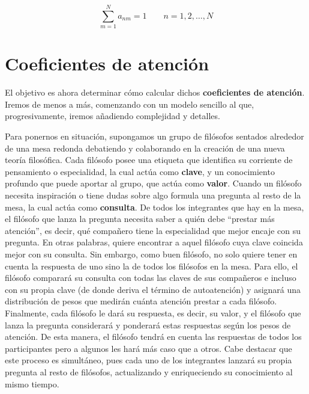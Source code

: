 \begin{equation}
    \sum_{m=1}^{N} a_{nm} = 1 \qquad n=1,2,\dots, N
    \label{atencion_suma_1}
\end{equation}

\section{Coeficientes de atención}
El objetivo es ahora determinar cómo calcular dichos 
\textbf{coeficientes de atención}. Iremos de menos a más, comenzando con 
un modelo sencillo al que, progresivamente, iremos añadiendo complejidad y 
detalles.

Para ponernos en situación, supongamos un grupo de filósofos sentados 
alrededor de una mesa redonda debatiendo y colaborando en la creación de una 
nueva teoría filosófica. Cada filósofo posee una etiqueta que identifica su 
corriente de pensamiento o especialidad, la cual actúa como \textbf{clave}, 
y un conocimiento profundo que puede aportar al grupo, que actúa como 
\textbf{valor}. Cuando un filósofo necesita inspiración o tiene dudas sobre 
algo formula una pregunta al resto de la mesa, la cual actúa como 
\textbf{consulta}. De todos los integrantes que hay en la mesa, el filósofo 
que lanza la pregunta necesita saber a quién debe ``prestar más atención'', 
es decir, qué compañero tiene la especialidad que mejor encaje con su 
pregunta. En otras palabras, quiere encontrar a aquel filósofo cuya clave 
coincida mejor con su consulta. Sin embargo, como buen filósofo, no solo 
quiere tener en cuenta la respuesta de uno sino la de todos los filósofos 
en la mesa. Para ello, el filósofo comparará su consulta con todas las 
claves de sus compañeros e incluso con su propia clave (de donde deriva el 
término de autoatención) y asignará una distribución de pesos que medirán 
cuánta atención prestar a cada filósofo. Finalmente, cada filósofo le dará 
su respuesta, es decir, su valor, y el filósofo que lanza la pregunta 
considerará y ponderará estas respuestas según los pesos de atención. De 
esta manera, el filósofo tendrá en cuenta las respuestas de todos los 
participantes pero a algunos les hará más caso que a otros. Cabe destacar 
que este proceso es simultáneo, pues cada uno de los integrantes lanzará su 
propia pregunta al resto de filósofos, actualizando y enriqueciendo su 
conocimiento al mismo tiempo.

